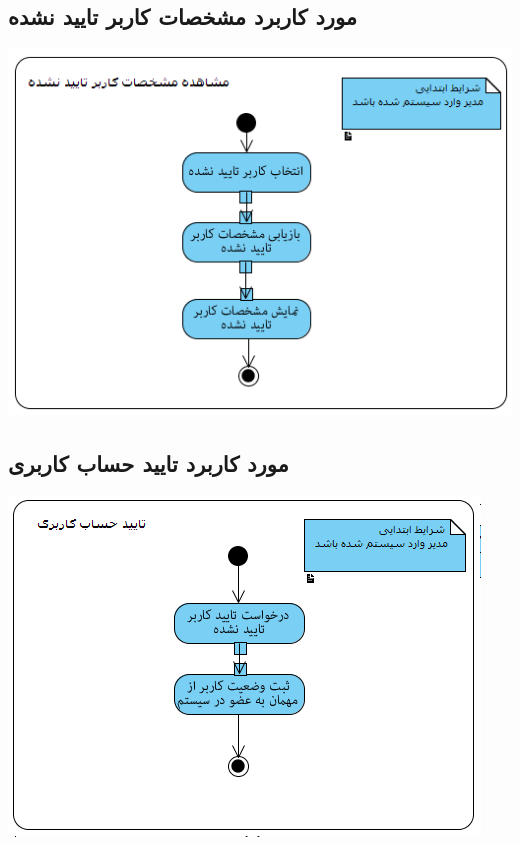 \documentclass{article}
\begin{document}
\newpage
\vspace{2cm}
\subsection*{مورد کاربرد مشخصات کاربر تایید نشده}
\vspace{2cm}
\begin{center}
\includegraphics[width=\textwidth]{ActivityDiagrams/5.png}
\end{center}

\newpage
\vspace{2cm}
\subsection*{مورد کاربرد تایید حساب کاربری}
\vspace{2cm}
\begin{center}
\includegraphics[width=\textwidth]{ActivityDiagrams/6.png}
\end{center}
\end{document}

